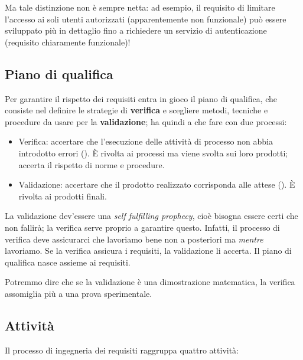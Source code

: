\documentclass[a4paper]{article}
\begin{document}
		
Ma tale distinzione non è sempre netta: ad esempio, il requisito di limitare l'accesso ai soli utenti autorizzati (apparentemente non funzionale) può essere sviluppato più in dettaglio fino a richiedere un servizio di autenticazione (requisito chiaramente funzionale)!

		
	\subsection{Piano di qualifica}

		
Per garantire il rispetto dei requisiti entra in gioco il piano di qualifica, che consiste nel definire le strategie di \textbf{verifica} e scegliere metodi, tecniche e procedure da usare per la \textbf{validazione}; ha quindi a che fare con due processi:
		
	\begin{itemize}
		
			
	\item Verifica: accertare che l'esecuzione delle attività di processo non abbia introdotto errori (). È rivolta ai processi ma viene svolta sui loro prodotti; accerta il rispetto di norme e procedure.
			
	\item Validazione: accertare che il prodotto realizzato corrisponda alle attese (). È rivolta ai prodotti finali.
		
	\end{itemize}

		
La validazione dev'essere una \emph{self fulfilling prophecy}, cioè bisogna essere certi che non fallirà; la verifica serve proprio a garantire questo. Infatti, il processo di verifica deve assicurarci che lavoriamo bene non a posteriori ma \emph{mentre} lavoriamo. Se la verifica assicura i requisiti, la validazione li accerta. Il piano di qualifica nasce assieme ai requisiti.
		
Potremmo dire che se la validazione è una dimostrazione matematica, la verifica assomiglia più a una prova sperimentale.%


		
	\subsection{Attività}

		
Il processo di ingegneria dei requisiti raggruppa quattro attività:
		
\end{document}
